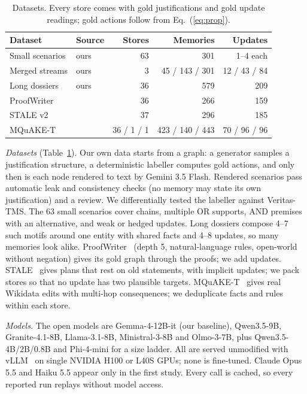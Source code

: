 \documentclass[conference]{IEEEtran}
\begin{document}
\begin{table}[t]
\caption{Datasets. Every store comes with gold justifications and gold update readings; gold actions follow from Eq.~(\ref{eq:prop}).}
\label{tab:data}
\centering
\footnotesize
\setlength{\tabcolsep}{2.5pt}
\begin{tabular}{@{}llrrr@{}}
\toprule
Dataset & Source & Stores & Memories & Updates \\
\midrule
Small scenarios & ours & 63 & 301 & 1--4 each \\
Merged streams & ours & 3 & 45 / 143 / 301 & 12 / 43 / 84 \\
Long dossiers & ours & 36 & 579 & 209 \\
ProofWriter & \cite{tafjord2021proofwriter} & 36 & 266 & 159 \\
STALE v2 & \cite{chao2026stale} & 37 & 296 & 185 \\
MQuAKE-T & \cite{zhong2023mquake} & 36 / 1 / 1 & 423 / 140 / 443 & 70 / 96 / 96 \\
\bottomrule
\end{tabular}
\end{table}

\textit{Datasets} (Table~\ref{tab:data}). Our own data starts from a graph: a generator samples a justification structure, a deterministic labeller computes gold actions, and only then is each node rendered to text by Gemini 3.5 Flash. Rendered scenarios pass automatic leak and consistency checks (no memory may state its own justification) and a review. We differentially tested the labeller against Veritas-TMS. The 63 small scenarios cover chains, multiple OR supports, AND premises with an alternative, and weak or hedged updates. Long dossiers compose 4--7 such motifs around one entity with shared facts and 4--8 updates, so many memories look alike. ProofWriter~\cite{tafjord2021proofwriter} (depth 5, natural-language rules, open-world without negation) gives its gold graph through the proofs; we add updates. STALE~\cite{chao2026stale} gives plans that rest on old statements, with implicit updates; we pack stores so that no update has two plausible targets. MQuAKE-T~\cite{zhong2023mquake} gives real Wikidata edits with multi-hop consequences; we deduplicate facts and rules within each store.

\textit{Models.} The open models are Gemma-4-12B-it (our baseline), Qwen3.5-9B, Granite-4.1-8B, Llama-3.1-8B, Ministral-3-8B and Olmo-3-7B, plus Qwen3.5-4B/2B/0.8B and Phi-4-mini for a size ladder. All are served unmodified with vLLM~\cite{kwon2023vllm} on single NVIDIA H100 or L40S GPUs; none is fine-tuned. Claude Opus 5.5 and Haiku 5.5 appear only in the first study. Every call is cached, so every reported run replays without model access.
\end{document}
